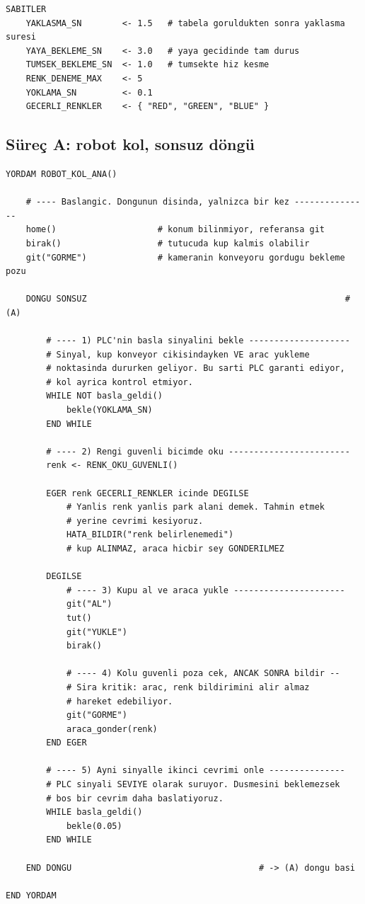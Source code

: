 \documentclass[11pt,a4paper]{article}
\begin{document}
\begin{verbatim}
SABITLER
    YAKLASMA_SN        <- 1.5   # tabela goruldukten sonra yaklasma suresi
    YAYA_BEKLEME_SN    <- 3.0   # yaya gecidinde tam durus
    TUMSEK_BEKLEME_SN  <- 1.0   # tumsekte hiz kesme
    RENK_DENEME_MAX    <- 5
    YOKLAMA_SN         <- 0.1
    GECERLI_RENKLER    <- { "RED", "GREEN", "BLUE" }
\end{verbatim}

\subsection*{Süreç A: robot kol, sonsuz döngü}

\begin{verbatim}
YORDAM ROBOT_KOL_ANA()

    # ---- Baslangic. Dongunun disinda, yalnizca bir kez ---------------
    home()                    # konum bilinmiyor, referansa git
    birak()                   # tutucuda kup kalmis olabilir
    git("GORME")              # kameranin konveyoru gordugu bekleme pozu

    DONGU SONSUZ                                                   # (A)

        # ---- 1) PLC'nin basla sinyalini bekle --------------------
        # Sinyal, kup konveyor cikisindayken VE arac yukleme
        # noktasinda dururken geliyor. Bu sarti PLC garanti ediyor,
        # kol ayrica kontrol etmiyor.
        WHILE NOT basla_geldi()
            bekle(YOKLAMA_SN)
        END WHILE

        # ---- 2) Rengi guvenli bicimde oku ------------------------
        renk <- RENK_OKU_GUVENLI()

        EGER renk GECERLI_RENKLER icinde DEGILSE
            # Yanlis renk yanlis park alani demek. Tahmin etmek
            # yerine cevrimi kesiyoruz.
            HATA_BILDIR("renk belirlenemedi")
            # kup ALINMAZ, araca hicbir sey GONDERILMEZ

        DEGILSE
            # ---- 3) Kupu al ve araca yukle ----------------------
            git("AL")
            tut()
            git("YUKLE")
            birak()

            # ---- 4) Kolu guvenli poza cek, ANCAK SONRA bildir --
            # Sira kritik: arac, renk bildirimini alir almaz
            # hareket edebiliyor.
            git("GORME")
            araca_gonder(renk)
        END EGER

        # ---- 5) Ayni sinyalle ikinci cevrimi onle ---------------
        # PLC sinyali SEVIYE olarak suruyor. Dusmesini beklemezsek
        # bos bir cevrim daha baslatiyoruz.
        WHILE basla_geldi()
            bekle(0.05)
        END WHILE

    END DONGU                                     # -> (A) dongu basi

END YORDAM
\end{verbatim}
\end{document}
